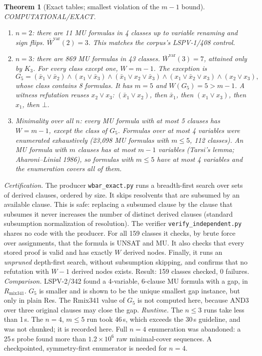 \documentclass[11pt]{article}
\newtheorem{theorem}{Theorem}
\begin{document}
\begin{theorem}[Exact tables; smallest violation of the $m-1$ bound]\label{t:g5}
COMPUTATIONAL/EXACT.
\begin{enumerate}
\item $n=2$: there are 11 MU formulas in 4 classes up to variable renaming and sign flips. $\overline W^{\mathrm{var}}(2)=3$.
This matches the corpus's LSPV-1/408 control.
\item $n=3$: there are 869 MU formulas in 43 classes. $\overline W^{\mathrm{var}}(3)=7$, attained only by $K_3$. For every class except
one, $W=m-1$. The exception is
\[
G_5=(\bar x_1\lor\bar x_2)\land(x_1\lor\bar x_3)\land(\bar x_1\lor x_2\lor\bar x_3)\land(x_1\lor\bar x_2\lor x_3)\land(x_2\lor x_3),
\]
whose class contains 8 formulas. It has $m=5$ and $W(G_5)=5>m-1$. A witness refutation reuses $x_2\lor x_3$:
$(\bar x_1\lor x_2)$, then $\bar x_1$, then $(x_1\lor x_3)$, then $x_1$, then $\bot$.
\item Minimality over all $n$: every MU formula with at most 5 clauses has $W=m-1$, except the class of $G_5$. Formulas over at most 4
variables were enumerated exhaustively (23{,}098 MU formulas with $m\le5$, 112 classes). An MU formula with $m$ clauses has at most
$m-1$ variables (Tarsi's lemma; Aharoni--Linial 1986), so formulas with $m\le5$ have at most 4 variables and the enumeration covers
all of them.
\end{enumerate}
\end{theorem}
\noindent\emph{Certification.} The producer \texttt{wbar\_exact.py} runs a breadth-first search over sets of derived clauses, ordered
by size. It skips resolvents that are subsumed by an available clause. This is safe: replacing a subsumed clause by the clause that
subsumes it never increases the number of distinct derived clauses (standard subsumption normalization of resolution). The verifier
\texttt{verify\_independent.py} shares no code with the producer. For all 159 classes it checks, by brute force over assignments, that
the formula is UNSAT and MU. It also checks that every stored proof is valid and has exactly $W$ derived nodes. Finally, it runs an
\emph{unpruned} depth-first search, without subsumption skipping, and confirms that no refutation with $W-1$ derived nodes exists.
Result: 159 classes checked, 0 failures.
\emph{Comparison.} LSPV-2/342 found a 4-variable, 6-clause MU formula with a gap, in $R_{\mathrm{mix341}}$. $G_5$ is smaller and is
shown to be the unique smallest gap instance, but only in plain Res. The Rmix341 value of $G_5$ is not computed here, because AND3 over
three original clauses may close the gap.
\emph{Runtime.} The $n\le3$ runs take less than 1\,s. The $n=4$, $m\le5$ run took 46\,s, which exceeds the 30\,s guideline, and was not
chunked; it is recorded here. Full $n=4$ enumeration was abandoned: a 25\,s probe found more than $1.2\times10^6$ raw minimal-cover
sequences. A checkpointed, symmetry-first enumerator is needed for $n=4$.
\end{document}
